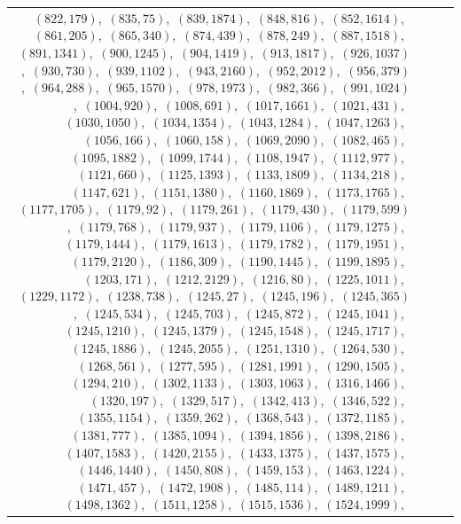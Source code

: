 \documentclass[11pt]{article}
\begin{document}
\begin{longtable}{@{}rrl>{\raggedright\arraybackslash}p{}@{}}
$(822,179)$,\allowbreak\ $(835,75)$,\allowbreak\ $(839,1874)$,\allowbreak\ $(848,816)$,\allowbreak\ $(852,1614)$,\allowbreak\ $(861,205)$,\allowbreak\ $(865,340)$,\allowbreak\ $(874,439)$,\allowbreak\ $(878,249)$,\allowbreak\ $(887,1518)$,\allowbreak\ $(891,1341)$,\allowbreak\ $(900,1245)$,\allowbreak\ $(904,1419)$,\allowbreak\ $(913,1817)$,\allowbreak\ $(926,1037)$,\allowbreak\ $(930,730)$,\allowbreak\ $(939,1102)$,\allowbreak\ $(943,2160)$,\allowbreak\ $(952,2012)$,\allowbreak\ $(956,379)$,\allowbreak\ $(964,288)$,\allowbreak\ $(965,1570)$,\allowbreak\ $(978,1973)$,\allowbreak\ $(982,366)$,\allowbreak\ $(991,1024)$,\allowbreak\ $(1004,920)$,\allowbreak\ $(1008,691)$,\allowbreak\ $(1017,1661)$,\allowbreak\ $(1021,431)$,\allowbreak\ $(1030,1050)$,\allowbreak\ $(1034,1354)$,\allowbreak\ $(1043,1284)$,\allowbreak\ $(1047,1263)$,\allowbreak\ $(1056,166)$,\allowbreak\ $(1060,158)$,\allowbreak\ $(1069,2090)$,\allowbreak\ $(1082,465)$,\allowbreak\ $(1095,1882)$,\allowbreak\ $(1099,1744)$,\allowbreak\ $(1108,1947)$,\allowbreak\ $(1112,977)$,\allowbreak\ $(1121,660)$,\allowbreak\ $(1125,1393)$,\allowbreak\ $(1133,1809)$,\allowbreak\ $(1134,218)$,\allowbreak\ $(1147,621)$,\allowbreak\ $(1151,1380)$,\allowbreak\ $(1160,1869)$,\allowbreak\ $(1173,1765)$,\allowbreak\ $(1177,1705)$,\allowbreak\ $(1179,92)$,\allowbreak\ $(1179,261)$,\allowbreak\ $(1179,430)$,\allowbreak\ $(1179,599)$,\allowbreak\ $(1179,768)$,\allowbreak\ $(1179,937)$,\allowbreak\ $(1179,1106)$,\allowbreak\ $(1179,1275)$,\allowbreak\ $(1179,1444)$,\allowbreak\ $(1179,1613)$,\allowbreak\ $(1179,1782)$,\allowbreak\ $(1179,1951)$,\allowbreak\ $(1179,2120)$,\allowbreak\ $(1186,309)$,\allowbreak\ $(1190,1445)$,\allowbreak\ $(1199,1895)$,\allowbreak\ $(1203,171)$,\allowbreak\ $(1212,2129)$,\allowbreak\ $(1216,80)$,\allowbreak\ $(1225,1011)$,\allowbreak\ $(1229,1172)$,\allowbreak\ $(1238,738)$,\allowbreak\ $(1245,27)$,\allowbreak\ $(1245,196)$,\allowbreak\ $(1245,365)$,\allowbreak\ $(1245,534)$,\allowbreak\ $(1245,703)$,\allowbreak\ $(1245,872)$,\allowbreak\ $(1245,1041)$,\allowbreak\ $(1245,1210)$,\allowbreak\ $(1245,1379)$,\allowbreak\ $(1245,1548)$,\allowbreak\ $(1245,1717)$,\allowbreak\ $(1245,1886)$,\allowbreak\ $(1245,2055)$,\allowbreak\ $(1251,1310)$,\allowbreak\ $(1264,530)$,\allowbreak\ $(1268,561)$,\allowbreak\ $(1277,595)$,\allowbreak\ $(1281,1991)$,\allowbreak\ $(1290,1505)$,\allowbreak\ $(1294,210)$,\allowbreak\ $(1302,1133)$,\allowbreak\ $(1303,1063)$,\allowbreak\ $(1316,1466)$,\allowbreak\ $(1320,197)$,\allowbreak\ $(1329,517)$,\allowbreak\ $(1342,413)$,\allowbreak\ $(1346,522)$,\allowbreak\ $(1355,1154)$,\allowbreak\ $(1359,262)$,\allowbreak\ $(1368,543)$,\allowbreak\ $(1372,1185)$,\allowbreak\ $(1381,777)$,\allowbreak\ $(1385,1094)$,\allowbreak\ $(1394,1856)$,\allowbreak\ $(1398,2186)$,\allowbreak\ $(1407,1583)$,\allowbreak\ $(1420,2155)$,\allowbreak\ $(1433,1375)$,\allowbreak\ $(1437,1575)$,\allowbreak\ $(1446,1440)$,\allowbreak\ $(1450,808)$,\allowbreak\ $(1459,153)$,\allowbreak\ $(1463,1224)$,\allowbreak\ $(1471,457)$,\allowbreak\ $(1472,1908)$,\allowbreak\ $(1485,114)$,\allowbreak\ $(1489,1211)$,\allowbreak\ $(1498,1362)$,\allowbreak\ $(1511,1258)$,\allowbreak\ $(1515,1536)$,\allowbreak\ $(1524,1999)$,\allowbreak\ 
\end{longtable}
\end{document}
